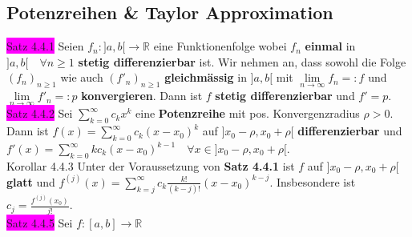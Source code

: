 \documentclass[landscape, 10pt]{article}
\newcommand{\R}{\mathbb{R}}
\begin{document}
\begin{multicols}{3}
       \subsection{Potenzreihen \& Taylor Approximation}
              \colorbox{magenta}{Satz 4.4.1} 
                     Seien \textcolor{NavyBlue}{$f_n:]a,b[\longrightarrow\R$} 
                     eine Funktionenfolge wobei \textcolor{NavyBlue}{$f_n$} 
                     \textbf{einmal} in 
                     \textcolor{NavyBlue}{$]a,b[\quad\forall n\geqslant1$} 
                     \textbf{stetig differenzierbar} ist.
                     Wir nehmen an, dass sowohl die Folge 
                     \textcolor{NavyBlue}{$(f_n)_{n\geqslant1}$} 
                     wie auch \textcolor{NavyBlue}{$(f'_n)_{n\geqslant1}$} 
                     \textbf{gleichmässig} in \textcolor{NavyBlue}{$]a,b[$} mit 
                     \textcolor{NavyBlue}{$\lim\limits_{n\to\infty}f_n=:f$} 
                     und \textcolor{NavyBlue}{$\lim\limits_{n\to\infty}f'_n=:p$}
                     \textbf{konvergieren}. Dann ist \textcolor{NavyBlue}{$f$}
                     \textbf{stetig differenzierbar} 
                     und \textcolor{NavyBlue}{$f'=p$}. \\
              \colorbox{magenta}{Satz 4.4.2} 
                     Sei \textcolor{NavyBlue}{$\sum_{k=0}^\infty c_kx^k$} 
                     eine \textbf{Potenzreihe} mit 
                     pos. Konvergenzradius \textcolor{NavyBlue}{$\rho>0$}. Dann ist
                     \textcolor{NavyBlue}{$f(x)=\sum_{k=0}^\infty c_k(x-x_0)^k$} 
                     auf \textcolor{NavyBlue}{$]x_0-\rho,x_0+\rho[$} 
                     \textbf{differenzierbar} und 
                     \textcolor{NavyBlue}{
                     $f'(x)=\sum_{k=0}^\infty kc_k(x-x_0)^{k-1}\quad
                     \forall x\in]x_0-\rho,x_0+\rho[$}.\\
              \colorbox{BurntOrange}{Korollar 4.4.3} 
                     Unter der Voraussetzung von \textbf{Satz 4.4.1} ist 
                     \textcolor{NavyBlue}{$f$} auf 
                     \textcolor{NavyBlue}{$]x_0-\rho,x_0+\rho[$} 
                     \textbf{glatt} und \textcolor{NavyBlue}{$f^{(j)}(x)
                     =\sum_{k=j}^\infty c_k\frac{k!}{(k-j)!}(x-x_0)^{k-j}$}. 
                     Insbesondere ist 
                     \textcolor{NavyBlue}{$c_j=\frac{f^{(j)}(x_0)}{j!}$}.\\
              \colorbox{magenta}{Satz 4.4.5} 
                     Sei \textcolor{NavyBlue}{$f:[a,b]\longrightarrow\R$}

\end{multicols}
\end{document}
